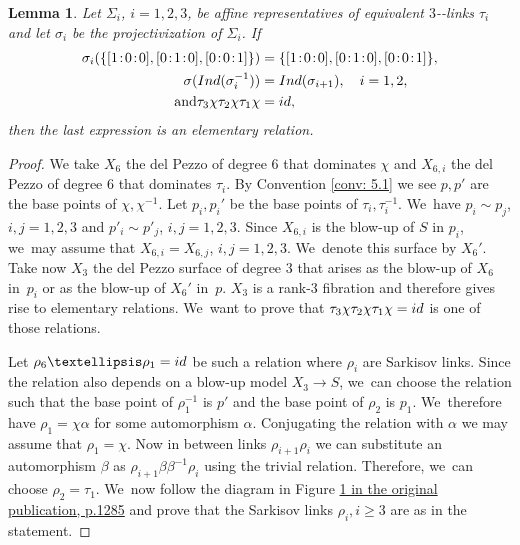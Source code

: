 \documentclass[10pt,a4paper]{amsart}
\providecommand{\nobreakdash}{\nobreak\hbox{-}}
\newcommand{\id}{\textup{id}}
\newcommand{\Ind}{\textup{Ind}}
\newcommand{\sep}{\mkern2mu{:}\mkern2mu}
\newtheorem{lemma}[theorem]{Lemma}
\theoremstyle{definition}
\begin{document}
\begin{lemma}\label{ElemRel}
Let $\Sigma_i$, $i=1,2,3$, be affine representatives of equivalent $3$\nobreakdash-links $\tau_i$ and let $\sigma_i$ be the projectivization of $\Sigma_i$. If
\begin{align*}
\sigma_i(\{[1\sep 0\sep 0],[0\sep 1\sep 0],[0\sep 0\sep 1] \}) &= \{[1\sep 0\sep 0],[0\sep 1\sep 0],[0\sep 0\sep 1] \},
\\
\sigma (\Ind(\sigma_{i}^{-1})) &= \Ind(\sigma_{i+1}), \quad i=1,2,
\\
\tag*{and}
\tau_3 \chi \tau_2 \chi \tau_1 \chi &= \id,
\end{align*}
then the last expression is an elementary relation.
\end{lemma}

\begin{proof}
We take $X_6$ the del Pezzo of degree $6$ that dominates $\chi$ and $X_{6,i}$ the del Pezzo of degree $6$ that dominates $\tau_i$. By Convention \ref{conv: 5.1} we see $p,p'$ are the base points of $\chi, \chi^{-1}$. Let $p_i,p_i'$ be the base points of $\tau_i, \tau_i^{-1}$. We~have $p_i \sim p_j$, $i,j = 1,2,3$ and $p'_i \sim p'_j$, $i,j = 1,2,3$. Since $X_{6,i}$ is the blow-up of $S$ in $p_i$, we~may assume that $X_{6,i} = X_{6,j}$, $i,j = 1,2,3$. We~denote this surface by $X_6'$. Take now $X_3$ the del Pezzo surface of degree $3$ that arises as the blow-up of $X_6$ in~$p_i$ or as the blow-up of $X_6'$ in~$p$. $X_3$ is a rank-$3$ fibration and therefore gives rise to elementary relations. We~want to prove that $\tau_3 \chi \tau_2 \chi \tau_1 \chi = \id$ is one of those relations.

Let $\rho_6 \dots \rho_1 = \id$ be such a relation where $\rho_i$ are Sarkisov links. Since the relation also depends on a blow-up model $X_3 \to S$, we~can choose the relation such that the base point of $\rho_1^{-1}$ is $p'$ and the base point of $\rho_2$ is $p_1$. We~therefore have $\rho_1 = \chi \alpha$ for some automorphism $\alpha$. Conjugating the relation with $\alpha$ we may assume that $\rho_1 = \chi$. Now in between links $\rho_{i + 1} \rho_i$ we can substitute an automorphism $\beta$ as $\rho_{i + 1} \beta \beta^{-1} \rho_i$ using the trivial relation. Therefore, we~can choose $\rho_2 = \tau_1$. We~now follow the diagram in Figure \href{https://jep.centre-mersenne.org/articles/10.5802/jep.347/}{1 in the original publication, p.1285} and prove that the Sarkisov links $\rho_i, i \geq 3$ are as in the statement.


\end{proof}
\end{document}

